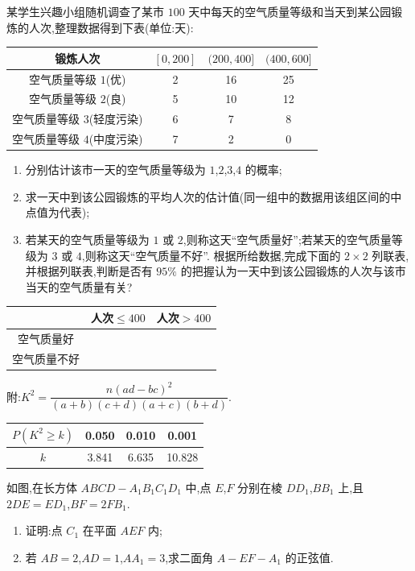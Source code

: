\begin{problem}
某学生兴趣小组随机调查了某市 \(100\) 天中每天的空气质量等级和当天到某公园锻炼的人次,整理数据得到下表(单位:天):

\begin{center}
\begin{tabular}{c|ccc}
锻炼人次 & \([0,200]\) & \((200,400]\) & \((400,600]\) \\
\hline
空气质量等级 \(1\)(优) & 2 & 16 & 25 \\
空气质量等级 \(2\)(良) & 5 & 10 & 12 \\
空气质量等级 \(3\)(轻度污染) & 6 & 7 & 8 \\
空气质量等级 \(4\)(中度污染) & 7 & 2 & 0
\end{tabular}
\end{center}

\begin{enumerate}
\item 分别估计该市一天的空气质量等级为 \(1\),\(2\),\(3\),\(4\) 的概率;
\item 求一天中到该公园锻炼的平均人次的估计值(同一组中的数据用该组区间的中点值为代表);
\item 若某天的空气质量等级为 \(1\) 或 \(2\),则称这天``空气质量好'';若某天的空气质量等级为 \(3\) 或 \(4\),则称这天``空气质量不好''. 根据所给数据,完成下面的 \(2\times2\) 列联表,并根据列联表,判断是否有 \(95\%\) 的把握认为一天中到该公园锻炼的人次与该市当天的空气质量有关?
\end{enumerate}

\begin{center}
\begin{tabular}{c|cc}
 & 人次\(\le400\) & 人次\(>400\) \\
\hline
空气质量好 &  &  \\
空气质量不好 &  &
\end{tabular}
\end{center}

附:\(K^2=\dfrac{n(ad-bc)^2}{(a+b)(c+d)(a+c)(b+d)}\).

\begin{center}
\begin{tabular}{c|ccc}
\(P(K^2\ge k)\) & 0.050 & 0.010 & 0.001 \\
\hline
\(k\) & 3.841 & 6.635 & 10.828
\end{tabular}
\end{center}
\end{problem}

\begin{problem}
如图,在长方体 \(ABCD-A_1B_1C_1D_1\) 中,点 \(E\),\(F\) 分别在棱 \(DD_1\),\(BB_1\) 上,且 \(2DE=ED_1\),\(BF=2FB_1\).

\begin{enumerate}
\item 证明:点 \(C_1\) 在平面 \(AEF\) 内;
\item 若 \(AB=2\),\(AD=1\),\(AA_1=3\),求二面角 \(A-EF-A_1\) 的正弦值.
\end{enumerate}

\end{problem}

